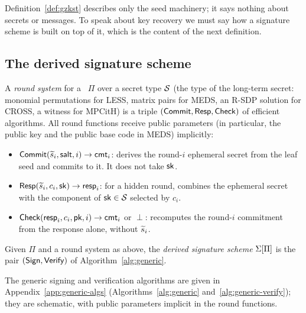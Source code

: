Definition~\ref{def:gzkst} describes only the seed machinery; it says nothing
about secrets or messages. To speak about key recovery we must say how a
signature scheme is built on top of it, which is the content of the next
definition.

\subsection{The derived signature scheme}
\label{sec:derived}

\begin{definition}
\label{def:round}
A \emph{round system} for a \GZKST\ $\Pi$ over a secret type $\mathcal{S}$ (the type
of the long-term secret: monomial permutations for LESS, matrix pairs for
MEDS, an R-SDP solution for CROSS, a witness for MPCitH) is a triple
$(\mathsf{Commit}, \mathsf{Resp}, \mathsf{Check})$ of efficient algorithms.
All round functions receive public parameters (in particular, the public
key and the public base code in MEDS) implicitly:
\begin{itemize}[leftmargin=*]
  \item $\mathsf{Commit}(\widetilde{s}_i, \mathsf{salt}, i) \to \mathsf{cmt}_i$: derives the round-$i$
        ephemeral secret from the leaf seed and commits to it. It does not
        take $\mathsf{sk}$.
  \item $\mathsf{Resp}(\widetilde{s}_i, c_i, \mathsf{sk}) \to \mathsf{resp}_i$: for a hidden round, combines
        the ephemeral secret with the component of $\mathsf{sk} \in \mathcal{S}$ selected by
        $c_i$.
  \item $\mathsf{Check}(\mathsf{resp}_i, c_i, \mathsf{pk}, i) \to \mathsf{cmt}_i$ or $\perp$: recomputes the
        round-$i$ commitment from the response alone, without $\widetilde{s}_i$.
\end{itemize}
\end{definition}

\begin{definition}
\label{def:sigma}
Given $\Pi$ and a round system as above, the \emph{derived signature scheme}
$\Sigma[\Pi]$ is the pair $(\mathsf{Sign}, \mathsf{Verify})$ of Algorithm~\ref{alg:generic}.
\end{definition}

The generic signing and verification algorithms are given in
Appendix~\ref{app:generic-algs} (Algorithms~\ref{alg:generic}
and~\ref{alg:generic-verify}); they are schematic, with public parameters
implicit in the round functions.

